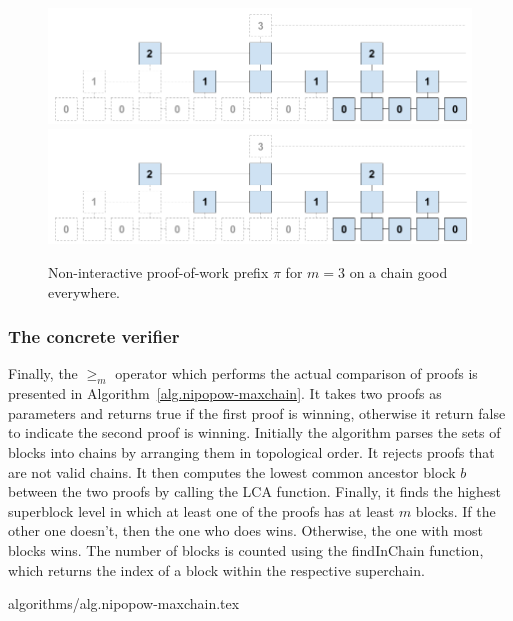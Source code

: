 \begin{figure}[h]
    \caption{
    Non-interactive proof-of-work prefix $\pi$ for $m = 3$ on a chain good
    everywhere.
    }
    \centering
    \iftwocolumn
        \includegraphics[width=\columnwidth,keepaspectratio]{figures/non-interactive-popow.png}
    \else
        \includegraphics[width=0.7\columnwidth,keepaspectratio]{figures/non-interactive-popow.png}
    \fi
    \label{fig.nipopow}
\end{figure}

\subsubsection{The concrete verifier}

Finally, the $\geq_m$ operator which performs the actual comparison of proofs
is presented in Algorithm~\ref{alg.nipopow-maxchain}. It takes two proofs as
parameters and returns true if the first proof is winning, otherwise it return
false to indicate the second proof is winning. Initially the algorithm parses
the sets of blocks into chains by arranging them in topological order. It
rejects proofs that are not valid chains. It then computes the lowest common
ancestor block $b$ between the two proofs by calling the LCA function. Finally,
it finds the highest superblock level in which at least one of the proofs has
at least $m$ blocks. If the other one doesn't, then the one who does wins.
Otherwise, the one with most blocks wins. The number of blocks is counted using
the findInChain function, which returns the index of a block within the
respective superchain.

{algorithms/alg.nipopow-maxchain.tex}
